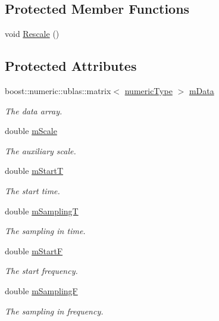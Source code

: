 \subsection*{Protected Member Functions}
\begin{DoxyCompactItemize}
\item 
void \hyperlink{classtsa_1_1_t_f_view_ac93678cadb31386dfffd7e9e0ce2fb0b}{Rescale} ()
\end{DoxyCompactItemize}
\subsection*{Protected Attributes}
\begin{DoxyCompactItemize}
\item 
boost\+::numeric\+::ublas\+::matrix$<$ \hyperlink{classtsa_1_1_t_f_view_a9dcd740f5d29edefd0a181917a9c700b}{numeric\+Type} $>$ \hyperlink{classtsa_1_1_t_f_view_a2681e1d8a18806d0add738068a43bf11}{m\+Data}
\begin{DoxyCompactList}\small\item\em The data array. \end{DoxyCompactList}\item 
double \hyperlink{classtsa_1_1_t_f_view_a1f7ed10cd264a12d99744197c134e1bf}{m\+Scale}
\begin{DoxyCompactList}\small\item\em The auxiliary scale. \end{DoxyCompactList}\item 
double \hyperlink{classtsa_1_1_t_f_view_a42d5dc9edb5b4d6c746d5c1a1614abb4}{m\+StartT}
\begin{DoxyCompactList}\small\item\em The start time. \end{DoxyCompactList}\item 
double \hyperlink{classtsa_1_1_t_f_view_a0195d10ff8a0c865975f81ea67c64816}{m\+SamplingT}
\begin{DoxyCompactList}\small\item\em The sampling in time. \end{DoxyCompactList}\item 
double \hyperlink{classtsa_1_1_t_f_view_afd3043fa47a3c337b1eedcb5cad1aa63}{m\+StartF}
\begin{DoxyCompactList}\small\item\em The start frequency. \end{DoxyCompactList}\item 
double \hyperlink{classtsa_1_1_t_f_view_a7c966f8d9d2e2f2e4790ed5067f46f40}{m\+SamplingF}
\begin{DoxyCompactList}\small\item\em The sampling in frequency. \end{DoxyCompactList}\end{DoxyCompactItemize}


